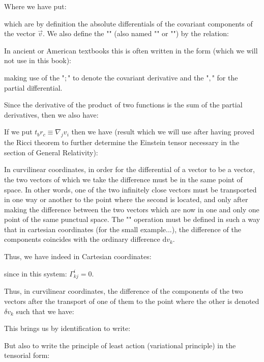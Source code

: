 	Where we have put:
	
	which are by definition the absolute differentials of the covariant components of the vector $\vec{v}$. We also define the "\label{covariant derivative}" (also named "" or "") by the relation:
	
	\begin{tcolorbox}[title=Remark,colframe=black,arc=10pt]
	In ancient or American textbooks this is often written in the form (which we will not use in this book):
	
	making use of the "$;$" to denote the covariant derivative and the "$,$" for the partial differential.
	\end{tcolorbox}
	Since the derivative of the product of two functions is the sum of the partial derivatives, then we also have:
	
	If we put $t_br_c\equiv \nabla_j v_i$ then we have (result which we will use after having proved the Ricci theorem to further determine the Einstein tensor necessary in the section of General Relativity):
	
	In curvilinear coordinates, in order for the differential of a vector to be a vector, the two vectors of which we take the difference must be in the same point of space. In other words, one of the two infinitely close vectors must be transported in one way or another to the point where the second is located, and only after making the difference between the two vectors which are now in one and only one point of the same punctual space. The "" operation must be defined in such a way that in cartesian coordinates (for the small example...), the difference of the components coincides with the ordinary difference $\mathrm{d}v_k$. 
	
	Thus, we have indeed in Cartesian coordinates:
	
	since in this system: $\Gamma_{kj}^i=0$.
	
	Thus, in curvilinear coordinates, the difference of the components of the two vectors after the transport of one of them to the point where the other is denoted $\delta v_k$ such that we have:
	
	This brings us by identification to write:
	
	But also to write the principle of least action (variational principle) in the tensorial form:
	
